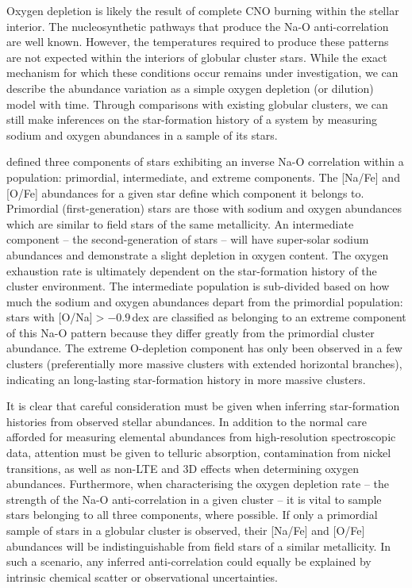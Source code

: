 \documentclass{emulateapj}
\begin{document}
Oxygen depletion is likely the result of complete CNO burning within the stellar interior. The nucleosynthetic pathways that produce the {Na-O} anti-correlation are well known. However, the temperatures required to produce these patterns are not expected within the interiors of globular cluster stars. While the exact mechanism for which these conditions occur remains under investigation, we can describe the abundance variation as a simple oxygen depletion (or dilution) model with time. Through comparisons with existing globular clusters, we can still make inferences on the star-formation history of a system by measuring sodium and oxygen abundances in a sample of its stars.

\citet{carretta;et-al_2009a} defined three components of stars exhibiting an inverse {Na-O} correlation within a population: primordial, intermediate, and extreme components. The [Na/Fe] and [O/Fe] abundances for a given star define which component it belongs to. Primordial (first-generation) stars are those with sodium and oxygen abundances which are similar to field stars of the same metallicity. An intermediate component -- the second-generation of stars -- will have super-solar sodium abundances and demonstrate a slight depletion in oxygen content. The oxygen exhaustion rate is ultimately dependent on the star-formation history of the cluster environment. The intermediate population is sub-divided based on how much the sodium and oxygen abundances depart from the primordial population: stars with {[O/Na]$ > -0.9$\,dex} are classified as belonging to an extreme component of this {Na-O} pattern because they differ greatly from the primordial cluster abundance. The extreme O-depletion component has only been observed in a few clusters (preferentially more massive clusters with extended horizontal branches), indicating an long-lasting star-formation history in more massive clusters.

It is clear that careful consideration must be given when inferring star-formation histories from observed stellar abundances. In addition to the normal care afforded for measuring elemental abundances from high-resolution spectroscopic data, attention must be given to telluric absorption, contamination from nickel transitions, as well as non-LTE and 3D effects when determining oxygen abundances. Furthermore, when characterising the oxygen depletion rate -- the strength of the {Na-O} anti-correlation in a given cluster -- it is vital to sample stars belonging to all three components, where possible. If only a primordial sample of stars in a globular cluster is observed, their [Na/Fe] and [O/Fe] abundances will be indistinguishable from field stars of a similar metallicity. In such a scenario, any inferred anti-correlation could equally be explained by intrinsic chemical scatter or observational uncertainties.
\end{document}
